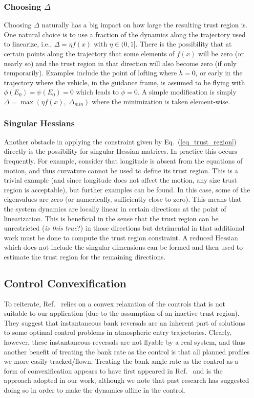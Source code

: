\documentclass[10pt,a4paper]{article}
\begin{document}
	\subsubsection{Choosing $ \Delta $}
	Choosing $\Delta$ naturally has a big impact on how large the resulting trust region is. One natural choice is to use a fraction of the dynamics along the trajectory used to linearize, i.e., $\Delta = \eta f(x)$ with $\eta\in(0,1]$. There is the possibility that at certain points along the trajectory that some elements of $f(x)$ will be zero (or nearly so) and the trust region in that direction will also become zero (if only temporarily). Examples include the point of lofting where $\dot{h}=0$, or early in the trajectory where the vehicle, in the guidance frame, is assumed to be flying with $\phi(E_0)=\psi(E_0)=0$ which leads to $\dot{\phi}=0$. A simple modification is simply $\Delta = \max(\eta f(x),\; \Delta_{min})$ where the minimization is taken element-wise.
	\subsubsection{Singular Hessians }
	Another obstacle in applying the constraint given by Eq.~(\ref{eq_trust_region}) directly is the possibility for singular Hessian matrices. In practice this occurs frequently. For example, consider that longitude is absent from the equations of motion, and thus curvature cannot be used to define its trust region. This is a trivial example (and since longitude does not affect the motion, any size trust region is acceptable), but further examples can be found. In this case, some of the eigenvalues are zero (or numerically, sufficiently close to zero). This means that the system dynamics are locally linear in certain directions at the point of linearization. This is beneficial in the sense that the trust region can be unrestricted (\textit{is this true}?) in those directions but detrimental in that additional work must be done to compute the trust region constraint. A reduced Hessian which does not include the singular dimensions can be formed and then used to estimate the trust region for the remaining directions.
	
	\subsection{Control Convexification}
	To reiterate, Ref.~\cite{SOCP Lu} relies on a convex relaxation of the controls that is not suitable to our application (due to the assumption of an inactive trust region). They suggest that instantaneous bank reversals are an inherent part of solutions to some optimal control problems in atmospheric entry trajectories. Clearly, however, these instantaneous reversals are not flyable by a real system, and thus another benefit of treating the bank rate as the control is that all planned profiles we more easily tracked/flown. Treating the bank angle rate as the control as a form of convexification appears to have first appeared in Ref.~\cite{SOCP WangGrant} and is the approach adopted in our work, although we note that past research has suggested doing so in order to make the dynamics affine in the control.
\end{document}
